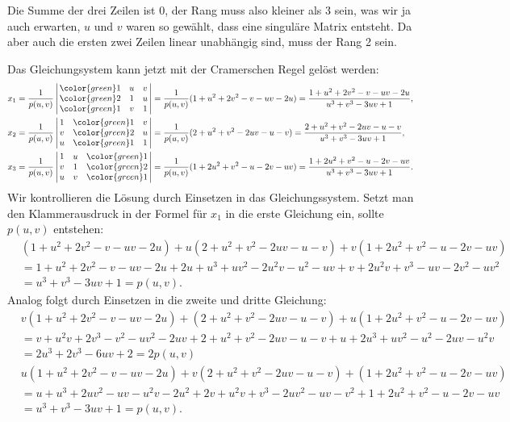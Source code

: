 \begin{loesung}
\begin{teilaufgaben}
Die Summe der drei Zeilen ist 0, der Rang muss also kleiner als 3 sein,
was wir ja auch erwarten, $u$ und $v$ waren so gewählt, dass eine singuläre
Matrix entsteht.
Da aber auch die ersten zwei Zeilen linear unabhängig sind, muss der
Rang 2 sein.
\item
Das Gleichungsystem kann jetzt mit der Cramerschen Regel gelöst werden:
\begin{align*}
x_1&=\frac1{p(u,v)}\left|\,\begin{matrix}
\color{green}1&u&v\\
\color{green}2&1&u\\
\color{green}1&v&1
\end{matrix}\,\right|
=\frac1{p(u,v)}
(1+u^2+2v^2-v-uv-2u)
=\frac{1+u^2+2v^2-v-uv-2u}{u^3+v^3-3uv+1},
\\
x_2&=\frac1{p(u,v)}\left|\,\begin{matrix}
1&\color{green}1&v\\
v&\color{green}2&u\\
u&\color{green}1&1
\end{matrix}\,\right|
=\frac1{p(u,v)}
(2+u^2+v^2-2uv-u-v)
=\frac{2+u^2+v^2-2uv-u-v}{u^3+v^3-3uv+1},
\\
x_3&=\frac1{p(u,v)}\left|\,\begin{matrix}
1&u&\color{green}1\\
v&1&\color{green}2\\
u&v&\color{green}1
\end{matrix}\,\right|
=\frac1{p(u,v)}
(1+2u^2+v^2-u-2v-uv)
=\frac{1+2u^2+v^2-u-2v-uv}{u^3+v^3-3uv+1}.
\end{align*}
Wir kontrollieren die Lösung durch Einsetzen in das Gleichungssystem.
Setzt man den Klammerausdruck in der Formel für $x_1$ in die erste Gleichung
ein, sollte $p(u,v)$ entstehen:
\begin{align*}
&(1+u^2+2v^2-v-uv-2u)
+
u(2+u^2+v^2-2uv-u-v)
+
v(1+2u^2+v^2-u-2v-uv)
\\
&=
1+u^2+2v^2-v-uv-2u
+
2u+u^3+uv^2-2u^2v-u^2-uv
+
v+2u^2v+v^3-uv-2v^2-uv^2
\\
&=u^3+v^3-3uv+1=p(u,v).
\end{align*}
Analog folgt durch Einsetzen in die zweite und dritte Gleichung:
\begin{align*}
&
v(1+u^2+2v^2-v-uv-2u)
+
(2+u^2+v^2-2uv-u-v)
+
u(1+2u^2+v^2-u-2v-uv)
\\
&=
v+u^2v+2v^3-v^2-uv^2-2uv
+
2+u^2+v^2-2uv-u-v
+
u+2u^3+uv^2-u^2-2uv-u^2v
\\
&=
2u^3+2v^3-6uv+2=2p(u,v)
\\
&
u(1+u^2+2v^2-v-uv-2u)
+
v(2+u^2+v^2-2uv-u-v)
+
(1+2u^2+v^2-u-2v-uv)
\\
&=
u+u^3+2uv^2-uv-u^2v-2u^2
+
2v+u^2v+v^3-2uv^2-uv-v^2
+
1+2u^2+v^2-u-2v-uv
\\
&=
u^3+v^3-3uv+1=p(u,v).
\end{align*}

\end{teilaufgaben}
\end{loesung}

